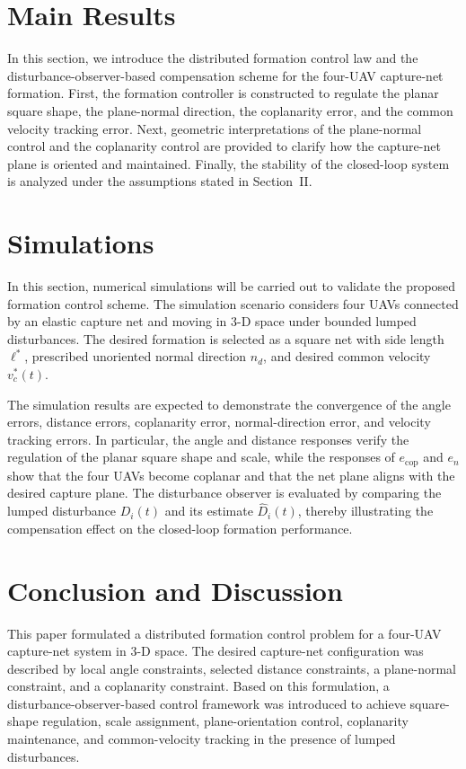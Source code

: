\documentclass[lettersize,journal]{IEEEtran}
\begin{document}
\section{Main Results}
In this section, we introduce the distributed formation control law and the disturbance-observer-based compensation scheme for the four-UAV capture-net formation. First, the formation controller is constructed to regulate the planar square shape, the plane-normal direction, the coplanarity error, and the common velocity tracking error. Next, geometric interpretations of the plane-normal control and the coplanarity control are provided to clarify how the capture-net plane is oriented and maintained. Finally, the stability of the closed-loop system is analyzed under the assumptions stated in Section~II.

\section{Simulations}
In this section, numerical simulations will be carried out to validate the proposed formation control scheme. The simulation scenario considers four UAVs connected by an elastic capture net and moving in 3-D space under bounded lumped disturbances. The desired formation is selected as a square net with side length \(\ell^*\), prescribed unoriented normal direction \(n_d\), and desired common velocity \(v_c^*(t)\).

The simulation results are expected to demonstrate the convergence of the angle errors, distance errors, coplanarity error, normal-direction error, and velocity tracking errors. In particular, the angle and distance responses verify the regulation of the planar square shape and scale, while the responses of \(e_{\mathrm{cop}}\) and \(e_n\) show that the four UAVs become coplanar and that the net plane aligns with the desired capture plane. The disturbance observer is evaluated by comparing the lumped disturbance \(D_i(t)\) and its estimate \(\hat D_i(t)\), thereby illustrating the compensation effect on the closed-loop formation performance.

\section{Conclusion and Discussion}
This paper formulated a distributed formation control problem for a four-UAV capture-net system in 3-D space. The desired capture-net configuration was described by local angle constraints, selected distance constraints, a plane-normal constraint, and a coplanarity constraint. Based on this formulation, a disturbance-observer-based control framework was introduced to achieve square-shape regulation, scale assignment, plane-orientation control, coplanarity maintenance, and common-velocity tracking in the presence of lumped disturbances.
\end{document}
